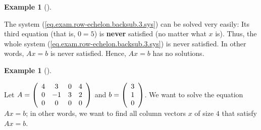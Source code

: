 \documentclass[numbers=enddot,12pt,final,onecolumn,notitlepage]{scrartcl}%
\theoremstyle{definition}
\newtheorem{exam}[theo]{Example}
\newenvironment{example}[1][]
{\begin{exam}[#1]\begin{leftbar}}
{\end{leftbar}\end{exam}}
\begin{document}
\begin{example}
The system (\ref{eq.exam.row-echelon.backsub.3.sys}) can be solved very
easily: Its third equation (that is, $0=5$) is \textbf{never} satisfied (no
matter what $x$ is). Thus, the whole system
(\ref{eq.exam.row-echelon.backsub.3.sys}) is never satisfied. In other words,
$Ax=b$ is never satisfied. Hence, $Ax=b$ has no solutions.
\end{example}

\begin{example}
\label{exam.row-echelon.backsub.4}Let $A=\left(
\begin{array}
[c]{cccc}%
4 & 3 & 0 & 4\\
0 & -1 & 3 & 2\\
0 & 0 & 0 & 0
\end{array}
\right)  $ and $b=\left(
\begin{array}
[c]{c}%
3\\
1\\
0
\end{array}
\right)  $. We want to solve the equation $Ax=b$; in other words, we want to
find all column vectors $x$ of size $4$ that satisfy $Ax=b$.


\end{example}
\end{document}
